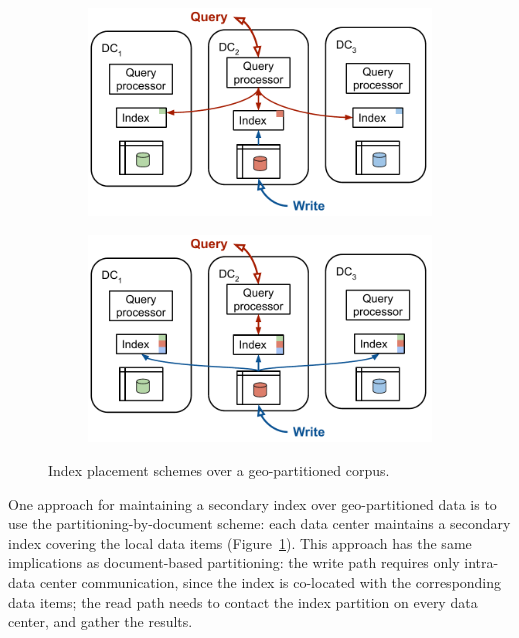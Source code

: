 \begin{figure}[H]
  \centering
  \begin{subfigure}[b]{0.48\textwidth}
    \centering
    \includegraphics[width=\textwidth]{./figures/design_space/geo_paritioning_local_index.pdf}
    \caption{}
    \label{fig:geo_paritioning_local_index}
  \end{subfigure}
  \hfill
  \begin{subfigure}[b]{0.48\textwidth}
    \centering
    \includegraphics[width=\textwidth]{./figures/design_space/geo_paritioning_global_indexes.pdf}
    \caption{}
    \label{fig:geo_paritioning_global_indexes}
  \end{subfigure}
  \caption{Index placement schemes over a geo-partitioned corpus.}
  \label{fig:index_placement_geo_partitioning}
\end{figure}

One approach for maintaining a secondary index over geo-partitioned data is to use the partitioning-by-document scheme:
each data center maintains a secondary index covering the local data items (Figure~\ref{fig:geo_paritioning_local_index}).
This approach has the same implications as document-based partitioning:
the write path requires only intra- data center communication, since the index is co-located with the corresponding data items;
the read path needs to contact the index partition on every data center, and gather the results.

